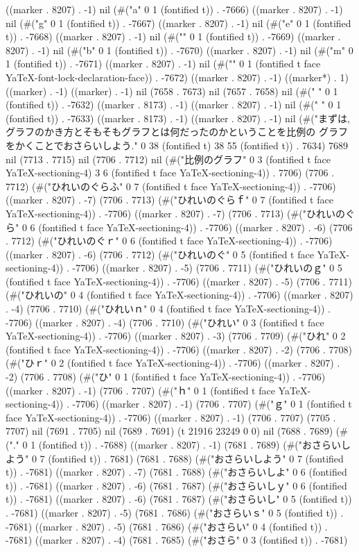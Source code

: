 ((marker . 8207) . -1) nil (#("a" 0 1 (fontified t)) . -7666) ((marker . 8207) . -1) nil (#("g" 0 1 (fontified t)) . -7667) ((marker . 8207) . -1) nil (#("e" 0 1 (fontified t)) . -7668) ((marker . 8207) . -1) nil (#("{" 0 1 (fontified t)) . -7669) ((marker . 8207) . -1) nil (#("b" 0 1 (fontified t)) . -7670) ((marker . 8207) . -1) nil (#("m" 0 1 (fontified t)) . -7671) ((marker . 8207) . -1) nil (#("}" 0 1 (fontified t face YaTeX-font-lock-declaration-face)) . -7672) ((marker . 8207) . -1) ((marker*) . 1) ((marker) . -1) ((marker) . -1) nil (7658 . 7673) nil (7657 . 7658) nil (#("
" 0 1 (fontified t)) . -7632) ((marker . 8173) . -1) ((marker . 8207) . -1) nil (#("
" 0 1 (fontified t)) . -7633) ((marker . 8173) . -1) ((marker . 8207) . -1) nil (#("まずは, グラフのかき方とそもそもグラフとは何だったのかということを比例の
グラフをかくことでおさらいしよう." 0 38 (fontified t) 38 55 (fontified t)) . 7634) 7689 nil (7713 . 7715) nil (7706 . 7712) nil (#("比例のグラフ" 0 3 (fontified t face YaTeX-sectioning-4) 3 6 (fontified t face YaTeX-sectioning-4)) . 7706) (7706 . 7712) (#("ひれいのぐらふ" 0 7 (fontified t face YaTeX-sectioning-4)) . -7706) ((marker . 8207) . -7) (7706 . 7713) (#("ひれいのぐらｆ" 0 7 (fontified t face YaTeX-sectioning-4)) . -7706) ((marker . 8207) . -7) (7706 . 7713) (#("ひれいのぐら" 0 6 (fontified t face YaTeX-sectioning-4)) . -7706) ((marker . 8207) . -6) (7706 . 7712) (#("ひれいのぐｒ" 0 6 (fontified t face YaTeX-sectioning-4)) . -7706) ((marker . 8207) . -6) (7706 . 7712) (#("ひれいのぐ" 0 5 (fontified t face YaTeX-sectioning-4)) . -7706) ((marker . 8207) . -5) (7706 . 7711) (#("ひれいのｇ" 0 5 (fontified t face YaTeX-sectioning-4)) . -7706) ((marker . 8207) . -5) (7706 . 7711) (#("ひれいの" 0 4 (fontified t face YaTeX-sectioning-4)) . -7706) ((marker . 8207) . -4) (7706 . 7710) (#("ひれいｎ" 0 4 (fontified t face YaTeX-sectioning-4)) . -7706) ((marker . 8207) . -4) (7706 . 7710) (#("ひれい" 0 3 (fontified t face YaTeX-sectioning-4)) . -7706) ((marker . 8207) . -3) (7706 . 7709) (#("ひれ" 0 2 (fontified t face YaTeX-sectioning-4)) . -7706) ((marker . 8207) . -2) (7706 . 7708) (#("ひｒ" 0 2 (fontified t face YaTeX-sectioning-4)) . -7706) ((marker . 8207) . -2) (7706 . 7708) (#("ひ" 0 1 (fontified t face YaTeX-sectioning-4)) . -7706) ((marker . 8207) . -1) (7706 . 7707) (#("ｈ" 0 1 (fontified t face YaTeX-sectioning-4)) . -7706) ((marker . 8207) . -1) (7706 . 7707) (#("ｇ" 0 1 (fontified t face YaTeX-sectioning-4)) . -7706) ((marker . 8207) . -1) (7706 . 7707) (7705 . 7707) nil (7691 . 7705) nil (7689 . 7691) (t 21916 23249 0 0) nil (7688 . 7689) (#("." 0 1 (fontified t)) . -7688) ((marker . 8207) . -1) (7681 . 7689) (#("おさらいしよう" 0 7 (fontified t)) . 7681) (7681 . 7688) (#("おさらいしよう" 0 7 (fontified t)) . -7681) ((marker . 8207) . -7) (7681 . 7688) (#("おさらいしよ" 0 6 (fontified t)) . -7681) ((marker . 8207) . -6) (7681 . 7687) (#("おさらいしｙ" 0 6 (fontified t)) . -7681) ((marker . 8207) . -6) (7681 . 7687) (#("おさらいし" 0 5 (fontified t)) . -7681) ((marker . 8207) . -5) (7681 . 7686) (#("おさらいｓ" 0 5 (fontified t)) . -7681) ((marker . 8207) . -5) (7681 . 7686) (#("おさらい" 0 4 (fontified t)) . -7681) ((marker . 8207) . -4) (7681 . 7685) (#("おさら" 0 3 (fontified t)) . -7681) 